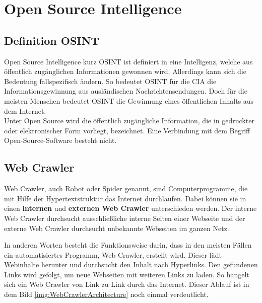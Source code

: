 \section{Open Source Intelligence}
	\subsection{Definition OSINT}
	Open Source Intelligence kurz OSINT ist definiert in eine Intelligenz, welche aus öffentlich zugänglichen Informationen gewonnen wird. Allerdings kann sich die Bedeutung fallspezifisch ändern. So bedeutet OSINT für die CIA die Informationsgewinnung aus ausländischen Nachrichtensendungen. Doch für die meisten Menschen bedeutet OSINT die Gewinnung eines öffentlichen Inhalts aus dem Internet. \cite{Bazzell}\\
	Unter Open Source wird die öffentlich zugängliche Information, die in gedruckter oder elektronischer Form vorliegt, bezeichnet.\cite{steele1996open} Eine Verbindung mit dem Begriff Open-Source-Software besteht nicht.
	\subsection{Web Crawler}
		Web Crawler, auch Robot oder Spider genannt, sind Computerprogramme, die mit Hilfe der Hypertextstruktur das Internet durchlaufen. \cite{thelwall2001web} Dabei können sie in einen \textbf{internen} und \textbf{externen Web Crawler} unterschieden werden. Der interne Web Crawler durchsucht ausschließliche interne Seiten einer Webseite und der externe Web Crawler durchsucht unbekannte Webseiten im ganzen Netz. \cite{sharma2012study}

		In anderen Worten besteht die Funktionsweise darin, dass in den meisten Fällen ein automatisiertes Programm, Web Crawler, erstellt wird. Dieser lädt Webinhalte herunter und durchsucht den Inhalt nach Hyperlinks. Den gefundenen Links wird gefolgt, um neue Webseiten mit weiteren Links zu laden. So hangelt sich ein Web Crawler von Link zu Link durch das Internet.\cite{WebScraping} Dieser Ablauf ist in dem Bild \ref{img:WebCrawlerArchitecture} noch einmal verdeutlicht.
		
